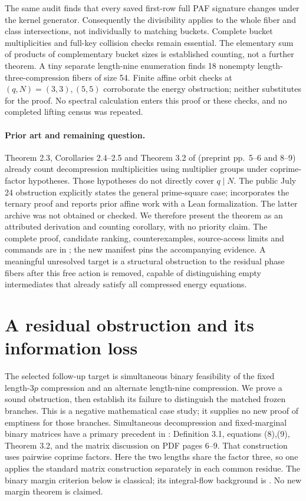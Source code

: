 \documentclass[11pt]{article}
\begin{document}
The same audit finds that every saved first-row full PAF signature changes
under the kernel generator. Consequently the divisibility applies to the
whole fiber and class intersections, not individually to matching buckets.
Complete bucket multiplicities and full-key collision checks remain essential.
The elementary sum of products of complementary bucket sizes is established
counting, not a further theorem. A tiny separate length-nine enumeration
finds 18 nonempty length-three-compression fibers of size 54. Finite affine
orbit checks at $(q,N)=(3,3),(5,5)$ corroborate the energy obstruction;
neither substitutes for the proof. No spectral calculation enters this proof
or these checks, and no completed lifting census was repeated.

\paragraph{Prior art and remaining question.}
Theorem 2.3, Corollaries 2.4--2.5 and Theorem 3.2 of \cite{turner77}
(preprint pp.~5--6 and 8--9) already count decompression multiplicities
using multiplier groups under coprime-factor hypotheses. Those hypotheses
do not directly cover $q\mid N$. The public July 24 obstruction
\cite{kernelissue} explicitly states the general prime-square case;
\cite{kernelreport} incorporates the ternary proof and reports prior
affine work with a Lean formalization. The latter archive was not obtained
or checked. We therefore present the theorem as an attributed derivation
and counting corollary, with no priority claim. The complete proof,
candidate ranking, counterexamples, source-access limits and commands are
in ; the new manifest pins
the accompanying evidence. A meaningful unresolved target is a structural
obstruction to the residual phase fibers after this free action is removed,
capable of distinguishing empty intermediates that already satisfy all
compressed energy equations.

\section{A residual obstruction and its information loss}\label{sec:residual}
The selected follow-up target is simultaneous binary feasibility of the
fixed length-$3p$ compression and an alternate length-nine compression.
We prove a sound obstruction, then establish its failure to distinguish
the matched frozen branches. This is a negative mathematical case study;
it supplies no new proof of emptiness for those branches.
Simultaneous decompression and fixed-marginal binary matrices have a primary
precedent in \cite[Section 3]{turner77}: Definition 3.1, equations (8),(9),
Theorem 3.2, and the matrix discussion on PDF pages 6--9. That construction
uses pairwise coprime factors. Here the two lengths share the factor three,
so one applies the standard matrix construction separately in each common
residue. The binary margin criterion below is classical; its integral-flow
background is \cite[pp.~1075--1078]{gale}. No new margin theorem is claimed.
\end{document}
